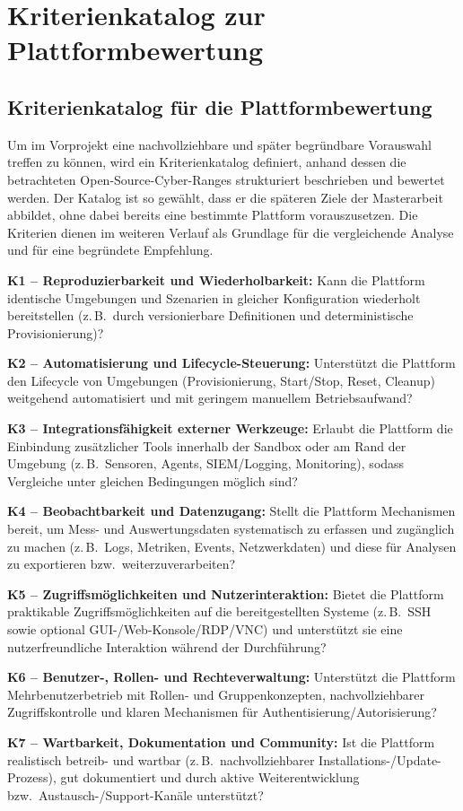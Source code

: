 \chapter{Kriterienkatalog zur Plattformbewertung}

\section{Kriterienkatalog für die Plattformbewertung}
\label{sec:kriterienkatalog}

Um im Vorprojekt eine nachvollziehbare und später begründbare Vorauswahl treffen zu können,
wird ein Kriterienkatalog definiert, anhand dessen die betrachteten Open-Source-Cyber-Ranges
strukturiert beschrieben und bewertet werden. Der Katalog ist so gewählt, dass er die späteren
Ziele der Masterarbeit abbildet, ohne dabei bereits eine bestimmte Plattform vorauszusetzen.
Die Kriterien dienen im weiteren Verlauf als Grundlage für die vergleichende Analyse und für
eine begründete Empfehlung.

\textbf{K1 -- Reproduzierbarkeit und Wiederholbarkeit:}
Kann die Plattform identische Umgebungen und Szenarien in gleicher Konfiguration wiederholt bereitstellen
(z.\,B.\ durch versionierbare Definitionen und deterministische Provisionierung)?

\textbf{K2 -- Automatisierung und Lifecycle-Steuerung:}
Unterstützt die Plattform den Lifecycle von Umgebungen (Provisionierung, Start/Stop, Reset, Cleanup)
weitgehend automatisiert und mit geringem manuellem Betriebsaufwand?

\textbf{K3 -- Integrationsfähigkeit externer Werkzeuge:}
Erlaubt die Plattform die Einbindung zusätzlicher Tools innerhalb der Sandbox oder am Rand der Umgebung
(z.\,B.\ Sensoren, Agents, SIEM/Logging, Monitoring), sodass Vergleiche unter gleichen Bedingungen möglich sind?

\textbf{K4 -- Beobachtbarkeit und Datenzugang:}
Stellt die Plattform Mechanismen bereit, um Mess- und Auswertungsdaten systematisch zu erfassen und zugänglich zu machen
(z.\,B.\ Logs, Metriken, Events, Netzwerkdaten) und diese für Analysen zu exportieren bzw.\ weiterzuverarbeiten?

\textbf{K5 -- Zugriffsmöglichkeiten und Nutzerinteraktion:}
Bietet die Plattform praktikable Zugriffsmöglichkeiten auf die bereitgestellten Systeme (z.\,B.\ SSH sowie optional GUI-/Web-Konsole/RDP/VNC)
und unterstützt sie eine nutzerfreundliche Interaktion während der Durchführung?

\textbf{K6 -- Benutzer-, Rollen- und Rechteverwaltung:}
Unterstützt die Plattform Mehrbenutzerbetrieb mit Rollen- und Gruppenkonzepten, nachvollziehbarer Zugriffskontrolle
und klaren Mechanismen für Authentisierung/Autorisierung?

\textbf{K7 -- Wartbarkeit, Dokumentation und Community:}
Ist die Plattform realistisch betreib- und wartbar (z.\,B.\ nachvollziehbarer Installations-/Update-Prozess),
gut dokumentiert und durch aktive Weiterentwicklung bzw.\ Austausch-/Support-Kanäle unterstützt?\newline
\newline


